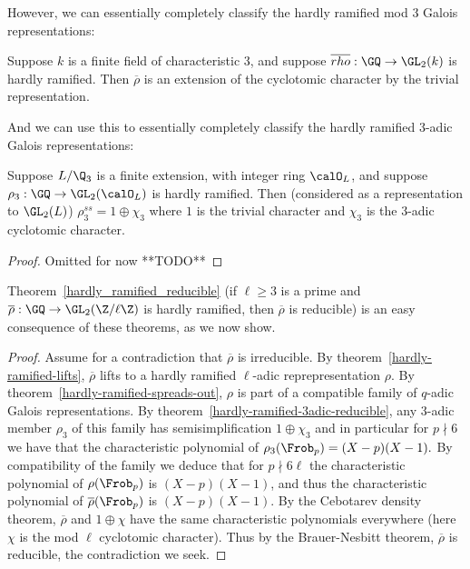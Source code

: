 However, we can essentially completely classify the hardly ramified mod 3 Galois representations:

\begin{theorem}
  \label{hardly-ramified-mod3-reducible}
  Suppose $k$ is a finite field of characteristic 3, and suppose
  $\overline{rho}:\GQ\to\GL_2(k)$ is hardly ramified. Then $\overline{\rho}$ is an extension
  of the cyclotomic character by the trivial representation.
\end{theorem}

And we can use this to essentially completely classify the hardly ramified 3-adic Galois
representations:

\begin{theorem}
  \label{hardly-ramified-3adic-reducible}
  Suppose $L/\Q_3$ is a finite extension, with integer ring $\calO_L$, and suppose
  $\rho_3:\GQ\to\GL_2(\calO_L)$ is hardly ramified. Then (considered as a representation
  to $\GL_2(L)$) $\rho_3^{ss}=1\oplus\chi_3$
  where $1$ is the trivial character and $\chi_3$ is the 3-adic cyclotomic character.
\end{theorem}
\begin{proof}
  Omitted for now **TODO**
\end{proof}

Theorem~\ref{hardly_ramified_reducible} (if $\ell\geq 3$ is a prime and
$\overline{\rho}:\GQ\to\GL_2(\Z/\ell\Z)$ is hardly ramified,
then $\overline{\rho}$ is reducible) is an easy consequence of these theorems,
as we now show.

\begin{proof}
  Assume for a contradiction that $\overline{\rho}$ is irreducible. By theorem~\ref{hardly-ramified-lifts},
  $\overline{\rho}$ lifts to a hardly ramified $\ell$-adic reprepresentation $\rho$. By
  theorem~\ref{hardly-ramified-spreads-out}, $\rho$ is part of a compatible family of
  $q$-adic Galois representations. By theorem~\ref{hardly-ramified-3adic-reducible},
  any 3-adic member $\rho_3$ of this family has semisimplification $1\oplus\chi_3$ and in particular
  for $p\nmid 6$ we have that the characteristic polynomial of $\rho_3(\Frob_p)=(X-p)(X-1).$
  By compatibility of the family we deduce that for $p\nmid 6\ell$ the characteristic
  polynomial of $\rho(\Frob_p)$ is $(X-p)(X-1)$, and thus the characteristic polynomial
  of $\overline{\rho}(\Frob_p)$ is $(X-p)(X-1)$. By the Cebotarev density theorem,
  $\overline{\rho}$ and $1\oplus\chi$ have the same characteristic polynomials everywhere
  (here $\chi$ is the mod $\ell$ cyclotomic character). Thus by the Brauer-Nesbitt theorem,
  $\overline{\rho}$ is reducible, the contradiction we seek.
\end{proof}

